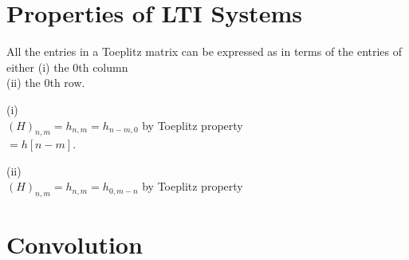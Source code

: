 \section{Properties of LTI Systems}




All the entries in a Toeplitz matrix can be expressed as 
in terms of the entries of either 
(i) the 0th column \\
(ii) the 0th row.

(i) \\
$(H)_{n,m} = h_{n,m} = h_{n-m,0}$ by Toeplitz property\\
$= h[n-m]$. 

(ii)\\
$(H)_{n,m} = h_{n,m} = h_{0,m-n}$ by Toeplitz property\\

\section{Convolution}